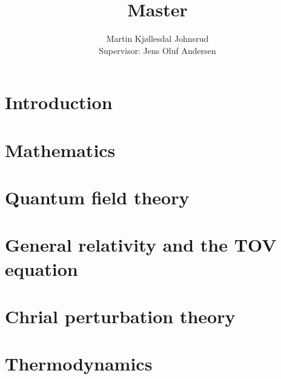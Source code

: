 \documentclass{book}
\title{\huge{Master}}
\author{
    \large{Martin Kjøllesdal Johnsrud}\\
    \normalsize{Supervisor: Jens Oluf Andersen}
    }
\begin{document}
    \maketitle
    \listoftodos
    \clearpage
    \tableofcontents
   
    \setlength{\parindent}{0em}
    \setlength{\parskip}{0.8em}

    \chapter{Introduction}
    \label{chapter: introduction}
    

    \chapter{Mathematics}
    \label{chapter: math}
    
    

    \chapter{Quantum field theory}
    \label{chapter: QFT}
    
    
    
    
    

    \chapter{General relativity and the TOV equation}
    \label{chapter: GR}
    
    
    

    \chapter{Chrial perturbation theory}
    \label{chapter: chpt}
    
    
    
    

    \chapter{Thermodynamics}
    \label{chapter: thermodynamics}
    
    
    
    
\end{document}
